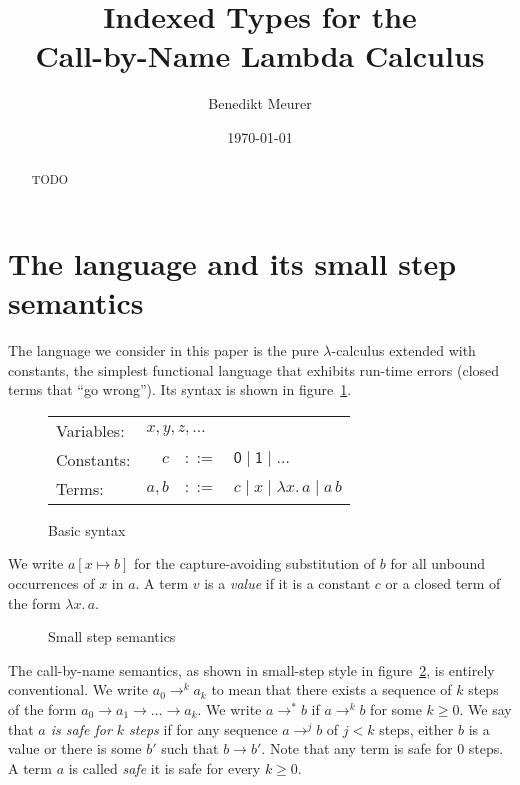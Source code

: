 \documentclass[12pt,a4paper,draft]{article}
\theoremstyle{definition}
\theoremstyle{plain}
\newcommand{\abstr}[2]{\ensuremath{\lambda{#1}.\,{#2}}}
\newcommand{\app}[2]{\ensuremath{{#1}\,{#2}}}
\begin{document}
\author{Benedikt Meurer}
\date{\today}
\title{Indexed Types for the\\Call-by-Name Lambda Calculus}
\maketitle

\begin{abstract}
  TODO
\end{abstract}


\section{The language and its small step semantics}
\label{sec:The_language_and_its_small_step_semantics}


The language we consider in this paper is the pure $\lambda$-calculus extended with constants,
the simplest functional language that exhibits run-time errors (closed terms that ``go wrong'').
Its syntax is shown in figure~\ref{fig:Basic_syntax}.
\begin{figure}[htb]
  \centering
  \begin{tabular}{lrcl}
    Variables: & \multicolumn{3}{l}{$x,y,z,\ldots$} \\
    Constants: & $c$ & $::=$ & $\mathsf{0} \mid \mathsf{1} \mid \ldots$ \\
    Terms: & $a,b$ & $::=$ & $c \mid x \mid \abstr{x}{a} \mid \app{a}{b}$
  \end{tabular}
  \caption{Basic syntax}
  \label{fig:Basic_syntax}
\end{figure}
We write $a[x \mapsto b]$ for the capture-avoiding substitution of $b$ for all unbound occurrences
of $x$ in $a$. A term $v$ is a \emph{value} if it is a constant $c$ or a closed term of the form
$\abstr{x}{a}$.

\begin{figure}[htb]
  \centering
  \caption{Small step semantics}
  \label{fig:Small_step_semantics}
\end{figure}
The call-by-name semantics, as shown in small-step style in figure~\ref{fig:Small_step_semantics}, is
entirely conventional. We write $a_0 \to^k a_k$ to mean that there exists a sequence of $k$ steps of the form
$a_0 \to a_1 \to \ldots \to a_k$. We write $a \to^* b$ if $a \to^k b$ for some $k \ge 0$. We say that
\emph{$a$ is safe for $k$ steps} if for any sequence $a \to^j b$ of $j < k$ steps, either $b$ is a value
or there is some $b'$ such that $b \to b'$. Note that any term is safe for $0$ steps. A term $a$ is called
\emph{safe} it is safe for every $k \ge 0$.
\end{document}
